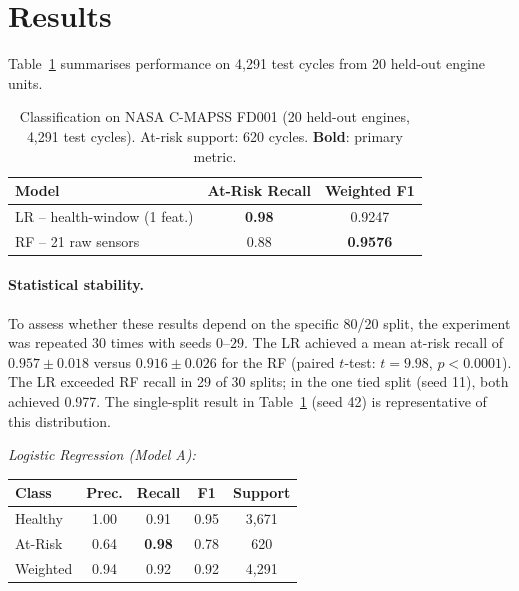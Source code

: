 \documentclass[10pt,twocolumn]{article}
\begin{document}
\section{Results}
\label{sec:results}

Table~\ref{tab:results} summarises performance on 4,291 test cycles from 20 held-out
engine units.

\begin{table}[h]
\centering
\caption{Classification on NASA C-MAPSS FD001 (20 held-out engines, 4,291 test cycles).
At-risk support: 620 cycles. \textbf{Bold}: primary metric.}
\label{tab:results}
\vspace{4pt}
\begin{tabular}{lcc}
\toprule
Model & At-Risk Recall & Weighted F1 \\
\midrule
LR -- health-window (1 feat.) & \textbf{0.98} & 0.9247 \\
RF -- 21 raw sensors           & 0.88          & \textbf{0.9576} \\
\bottomrule
\end{tabular}
\end{table}

\paragraph{Statistical stability.}
To assess whether these results depend on the specific 80/20 split, the experiment
was repeated 30 times with seeds $0$--$29$.
The LR achieved a mean at-risk recall of $\mathbf{0.957 \pm 0.018}$ versus
$\mathbf{0.916 \pm 0.026}$ for the RF (paired $t$-test: $t = 9.98$, $p < 0.0001$).
The LR exceeded RF recall in 29 of 30 splits; in the one tied split (seed 11), both
achieved 0.977.
The single-split result in Table~\ref{tab:results} (seed 42) is representative of this
distribution.



\noindent\textit{Logistic Regression (Model A):}
\begin{center}\small
\begin{tabular}{lcccc}
\toprule
Class & Prec. & Recall & F1 & Support\\
\midrule
Healthy  & 1.00 & 0.91 & 0.95 & 3,671\\
At-Risk  & 0.64 & \textbf{0.98} & 0.78 & 620\\
\midrule
Weighted & 0.94 & 0.92 & 0.92 & 4,291\\
\bottomrule
\end{tabular}
\end{center}
\end{document}
